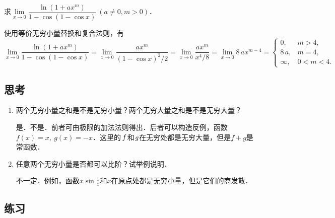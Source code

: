 \begin{example*}
  求\(\lim\limits_{x\to0} \dfrac{\ln(1+ax^m)}{1-\cos(1-\cos x)}\ (a \ne 0, m > 0)\)．\rule[-2ex]{0ex}{3.5ex}

  \begin{remark}
    使用等价无穷小量替换和复合法则，有
    \begin{equation*}
      \lim_{x\to0} \frac{\ln(1+ax^m)}{1-\cos(1-\cos x)}
      = \lim_{x\to0} \frac{ax^m}{(1-\cos x)^2\!/2}
      = \lim_{x\to0} \frac{ax^m}{x^4\!/8}
      = \lim_{x\to0} 8\,ax^{m-4} =
      \begin{cases}
        0, & m > 4, \\
        8\,a, & m = 4, \\
        \infty, & 0 < m < 4.
      \end{cases}
    \end{equation*}
  \end{remark}
\end{example*}

\subsection*{思考}

\begin{enumerate}
\item 两个无穷小量之和是不是无穷小量？两个无穷大量之和是不是无穷大量？

  \ifshowsolp
  是．不是．前者可由极限的加法法则得出．后者可以构造反例，函数\(f(x) = x,\ g(x) = -x\)．这里的\(\,f\mkern1mu\)和\(\mkern1mu g\)在无穷处都是无穷大量，但是\(f+g\)是常函数．
  \fi

\item 任意两个无穷小量是否都可以比阶？试举例说明．

  \ifshowsolp
  不一定．例如，函数\(x \sin\frac1x\)和\(x\)在原点处都是无穷小量，但是它们的商发散．
  \fi
\end{enumerate}

\ifshowex
{}
\subsection*{练习}

